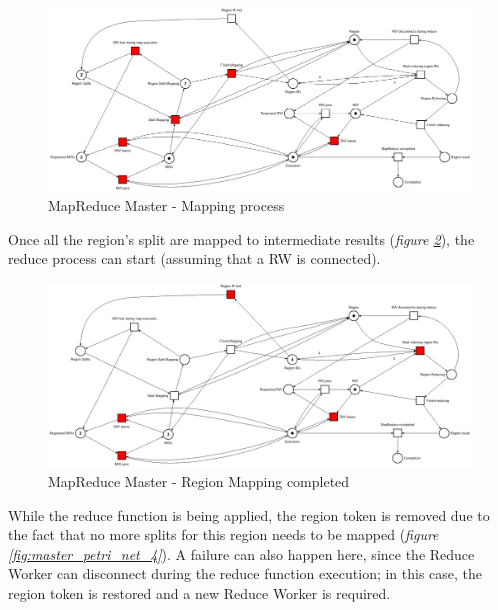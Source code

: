 \begin{figure}[!ht]
    \centering
    \includegraphics[width=\linewidth]{document/chapters/chapter_6/images/master_petri_net_2.png}
    \caption{MapReduce Master - Mapping process}
    \label{fig:master_petri_net_2}
\end{figure}

Once all the region's split are mapped to intermediate results (\textit{figure \ref{fig:master_petri_net_3}}), the reduce process can start (assuming that a RW is connected).

\begin{figure}[!ht]
    \centering
    \includegraphics[width=\linewidth]{document/chapters/chapter_6/images/master_petri_net_3.png}
    \caption{MapReduce Master - Region Mapping completed}
    \label{fig:master_petri_net_3}
\end{figure}

While the reduce function is being applied, the region token is removed due to the fact that no more splits for this region needs to be mapped (\textit{figure \ref{fig:master_petri_net_4}}). A failure can also happen here, since the Reduce Worker can disconnect during the reduce function execution; in this case, the region token is restored and a new Reduce Worker is required.

\vspace{5mm}

